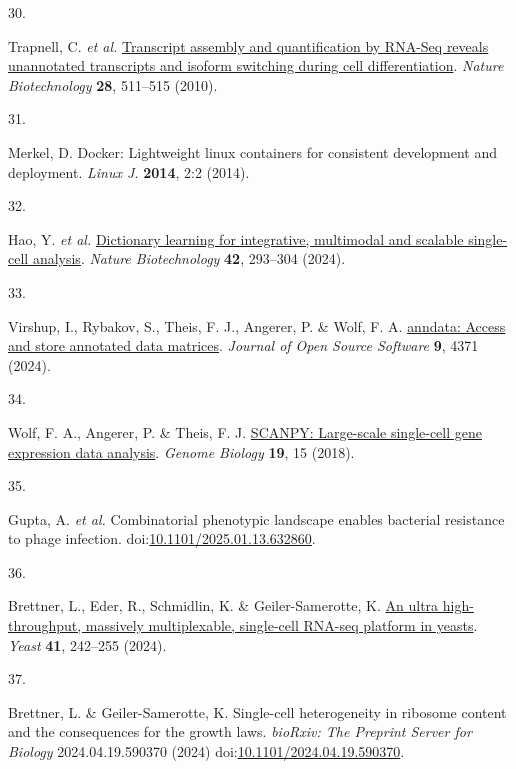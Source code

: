 \documentclass[
  11pt,
  a4paper,
]{report}
\newlength{\cslhangindent}
\newlength{\csllabelwidth}
\newenvironment{CSLReferences}[2] %
 {\begin{list}{}{%
  \setlength{\itemindent}{0pt}
  \setlength{\leftmargin}{0pt}
  \setlength{\parsep}{0pt}
  \ifodd #1
   \setlength{\leftmargin}{\cslhangindent}
   \setlength{\itemindent}{-1\cslhangindent}
  \fi
  \setlength{\itemsep}{#2\baselineskip}}}
 {\end{list}}
\newcommand{\CSLLeftMargin}[1]{\parbox[t]{\csllabelwidth}{\strut#1\strut}}
\newcommand{\CSLRightInline}[1]{\parbox[t]{\linewidth - \csllabelwidth}{\strut#1\strut}}
\begin{document}
\begin{CSLReferences}{0}{0}
\CSLLeftMargin{30. }%
\CSLRightInline{Trapnell, C. \emph{et al.}
\href{https://doi.org/10.1038/nbt.1621}{Transcript assembly and
quantification by RNA-Seq reveals unannotated transcripts and isoform
switching during cell differentiation}. \emph{Nature Biotechnology}
\textbf{28}, 511--515 (2010).}

\CSLLeftMargin{31. }%
\CSLRightInline{Merkel, D. Docker: Lightweight linux containers for
consistent development and deployment. \emph{Linux J.} \textbf{2014},
2:2 (2014).}

\CSLLeftMargin{32. }%
\CSLRightInline{Hao, Y. \emph{et al.}
\href{https://doi.org/10.1038/s41587-023-01767-y}{Dictionary learning
for integrative, multimodal and scalable single-cell analysis}.
\emph{Nature Biotechnology} \textbf{42}, 293--304 (2024).}

\CSLLeftMargin{33. }%
\CSLRightInline{Virshup, I., Rybakov, S., Theis, F. J., Angerer, P. \&
Wolf, F. A. \href{https://doi.org/10.21105/joss.04371}{anndata: Access
and store annotated data matrices}. \emph{Journal of Open Source
Software} \textbf{9}, 4371 (2024).}

\CSLLeftMargin{34. }%
\CSLRightInline{Wolf, F. A., Angerer, P. \& Theis, F. J.
\href{https://doi.org/10.1186/s13059-017-1382-0}{SCANPY: Large-scale
single-cell gene expression data analysis}. \emph{Genome Biology}
\textbf{19}, 15 (2018).}

\CSLLeftMargin{35. }%
\CSLRightInline{Gupta, A. \emph{et al.} Combinatorial phenotypic
landscape enables bacterial resistance to phage infection.
doi:\href{https://doi.org/10.1101/2025.01.13.632860}{10.1101/2025.01.13.632860}.}

\CSLLeftMargin{36. }%
\CSLRightInline{Brettner, L., Eder, R., Schmidlin, K. \&
Geiler-Samerotte, K. \href{https://doi.org/10.1002/yea.3927}{An ultra
high-throughput, massively multiplexable, single-cell RNA-seq platform
in yeasts}. \emph{Yeast} \textbf{41}, 242--255 (2024).}

\CSLLeftMargin{37. }%
\CSLRightInline{Brettner, L. \& Geiler-Samerotte, K. Single-cell
heterogeneity in ribosome content and the consequences for the growth
laws. \emph{bioRxiv: The Preprint Server for Biology} 2024.04.19.590370
(2024)
doi:\href{https://doi.org/10.1101/2024.04.19.590370}{10.1101/2024.04.19.590370}.}


\end{CSLReferences}
\end{document}
